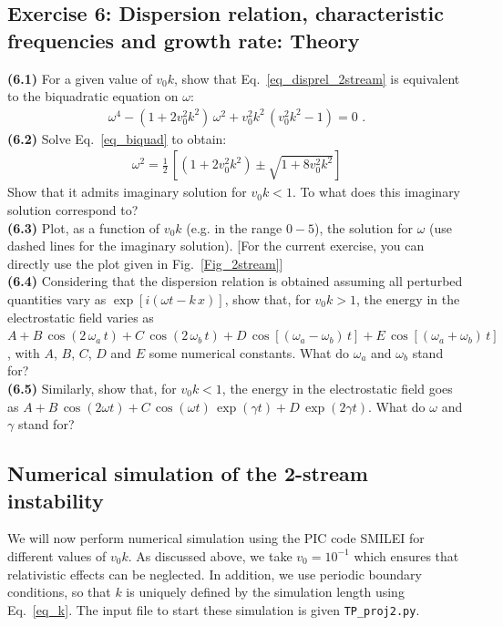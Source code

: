 \documentclass[11pt,a4paper]{article}
\begin{document}
\subsection*{Exercise 6: Dispersion relation, characteristic frequencies and growth rate: Theory}

{\bf (6.1)} For a given value of $v_0 k$, show that Eq.~\eqref{eq_disprel_2stream} is equivalent to the biquadratic equation on $\omega$:
\begin{eqnarray}\label{eq_biquad}
\omega^4 - (1+2 v_0^2 k^2)\,\omega^2 + v_0^2 k^2\,(v_0^2 k^2-1) = 0\,\,.
\end{eqnarray}
{\bf (6.2)} Solve Eq.~\eqref{eq_biquad} to obtain:
\begin{eqnarray}
\omega^2 = \frac{1}{2}\,\left[ (1+2 v_0^2 k^2) \pm \sqrt{1+8 v_0^2 k^2} \right]
\end{eqnarray}
Show that it admits imaginary solution for $v_0 k<1$. To what does this imaginary solution correspond to?\\
{\bf (6.3)} Plot, as a function of $v_0 k$ (e.g. in the range $0 - 5$),  the solution for $\omega$ (use dashed lines for the imaginary solution). [For the current exercise, you can directly use the plot given in Fig.~\ref{Fig_2stream}]\\
{\bf (6.4)} Considering that the dispersion relation is obtained assuming all perturbed quantities vary as $\exp[i(\omega t - k\,x)]$, show that, for $v_0 k>1$, the energy in the electrostatic field varies as $A + B\,\cos(2\,\omega_a\,t) + C\,\cos(2\,\omega_b\,t) + D\,\cos[(\omega_a-\omega_b)\,t] + E\,\cos[(\omega_a+\omega_b)\,t]$, with $A$, $B$, $C$, $D$ and $E$ some numerical constants. What do $\omega_a$ and $\omega_b$ stand for?\\
{\bf (6.5)} Similarly, show that, for $v_0 k<1$, the energy in the electrostatic field goes as $A + B\,\cos(2\omega t) + C\,\cos(\omega t)\,\exp(\gamma t)+D\,\exp(2\gamma t)$. What do $\omega$ and $\gamma$ stand for? 

\subsection*{Numerical simulation of the 2-stream instability}

We will now perform numerical simulation using the PIC code SMILEI for different values of $v_0 k$.
As discussed above, we take $v_0=10^{-1}$ which ensures that relativistic effects can be neglected.
In addition, we use periodic boundary conditions, so that $k$ is uniquely defined by the simulation length using Eq.~\eqref{eq_k}.
The input file to start these simulation is given \texttt{TP\_proj2.py}.
\end{document}
